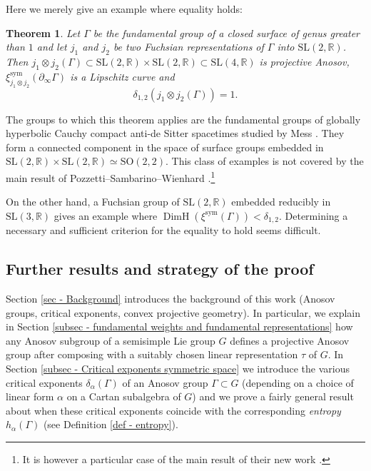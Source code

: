 \documentclass[11pt]{article}
\numberwithin{equation}{section}
\newcommand{\sym}{\mathrm{sym}}
\newtheorem{theo}{Theorem}[section]
\theoremstyle{definition}
\newcommand{\R}{\mathbb{R}}
\newcommand{\SL}{\mathrm{SL}}
\newcommand{\SO}{\mathrm{SO}}
\DeclareMathOperator{\DimH}{DimH}
\let\G\Gamma
\begin{document}
Here we merely give an example where equality holds:
\begin{theo} \label{theo - simple root exponent tensor product Fuchsian}
Let $\G$ be the fundamental group of a closed surface of genus greater than $1$ and let $j_1$ and $j_2$ be two Fuchsian representations of $\G$ into $\SL(2,\R)$. Then $j_1\otimes j_2(\G) \subset \SL(2,\R)\times \SL(2,\R) \subset \SL(4,\R)$ is projective Anosov, $\xi_{j_1\otimes j_2}^{\sym}(\partial_\infty \G)$ is a Lipschitz curve and
\[\delta_{1,2}(j_1\otimes j_2(\G)) = 1.\]
\end{theo}

The groups to which this theorem applies are the fundamental groups of globally hyperbolic Cauchy compact anti-de Sitter spacetimes studied by Mess \cite{mess2007lorentz}. They form a connected component in the space of surface groups embedded in \hbox{$\SL(2,\R)\times \SL(2,\R) \simeq \SO(2,2)$}. This class of examples is not covered by the main result of Pozzetti--Sambarino--Wienhard \cite{PSW19}.\footnote{It is however a particular case of the main result of their new work \cite{PSW19b}.}

On the other hand, a Fuchsian group of $\SL(2,\R)$ embedded reducibly in $\SL(3,\R)$ gives an example where $\DimH(\xi^{\sym}(\G)) < \delta_{1,2}$. Determining a necessary and sufficient criterion for the equality to hold seems difficult.

\subsection{Further results and strategy of the proof}

Section \ref{sec - Background} introduces the background of this work (Anosov groups, critical exponents, convex projective geometry). In particular, we explain in Section \ref{subsec - fundamental weights and fundamental representations} how any Anosov subgroup of a semisimple Lie group $G$ defines a projective Anosov group after composing with a suitably chosen linear representation $\tau$ of $G$. In Section \ref{subsec - Critical exponents symmetric space} we introduce the various critical exponents $\delta_\alpha(\G)$ of an Anosov group $\G\subset G$ (depending on a choice of linear form $\alpha$ on a Cartan subalgebra of $G$) and we prove a fairly general result about when these critical exponents coincide with the corresponding \emph{entropy} $h_\alpha(\Gamma)$ (see Definition \ref{def - entropy}).
\end{document}

